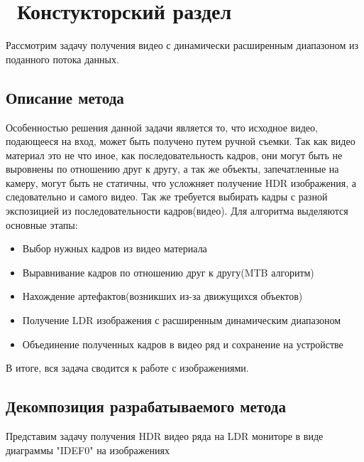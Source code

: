 \chapter{ Констукторский раздел}
\label{cha:design}

Рассмотрим задачу получения видео с динамически расширенным диапазоном из поданного потока данных. 

\section{ Описание метода}

    Особенностью решения данной задачи является то, что исходное видео, подающееся на вход, может быть получено путем ручной съемки. Так как видео материал это не что иное, как последовательность кадров, они могут быть не выровнены по отношению друг к другу, а так же объекты, запечатленные на камеру, могут быть не статичны, что усложняет получение HDR изображения, а следовательно и самого видео. Так же требуется выбирать кадры с разной экспозицией из последовательности кадров(видео). Для алгоритма выделяются основные этапы:

\begin{itemize}
    \item Выбор нужных кадров из видео материала
    \item Выравнивание кадров по отношению друг к другу(MTB алгоритм)
    \item Нахождение артефактов(возникших из-за движущихся объектов)
    \item Получение LDR изображения с расширенным динамическим диапазоном
    \item Объединение полученных кадров в видео ряд и сохранение на устройстве
\end{itemize}

В итоге, вся задача сводится к работе с изображениями.

\section{ Декомпозиция разрабатываемого метода}

Представим задачу получения HDR видео ряда на LDR мониторе в виде диаграммы "IDEF0" на изображениях
